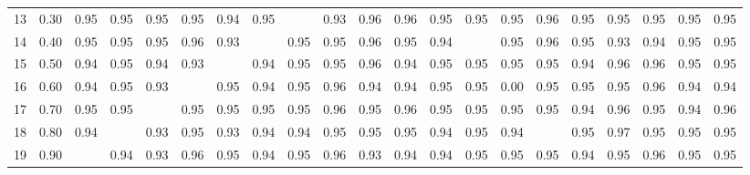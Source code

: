 \begin{table}[ht]
\begin{tabular}{rrrrrrrrrrrrrrrrrrrrr}
  13 & 0.30 & 0.95 & 0.95 & 0.95 & 0.95 & 0.94 & 0.95 &  & 0.93 & 0.96 & 0.96 & 0.95 & 0.95 & 0.95 & 0.96 & 0.95 & 0.95 & 0.95 & 0.95 & 0.95 \\ 
  14 & 0.40 & 0.95 & 0.95 & 0.95 & 0.96 & 0.93 &  & 0.95 & 0.95 & 0.96 & 0.95 & 0.94 &  & 0.95 & 0.96 & 0.95 & 0.93 & 0.94 & 0.95 & 0.95 \\ 
  15 & 0.50 & 0.94 & 0.95 & 0.94 & 0.93 &  & 0.94 & 0.95 & 0.95 & 0.96 & 0.94 & 0.95 & 0.95 & 0.95 & 0.95 & 0.94 & 0.96 & 0.96 & 0.95 & 0.95 \\ 
  16 & 0.60 & 0.94 & 0.95 & 0.93 &  & 0.95 & 0.94 & 0.95 & 0.96 & 0.94 & 0.94 & 0.95 & 0.95 & 0.00 & 0.95 & 0.95 & 0.95 & 0.96 & 0.94 & 0.94 \\ 
  17 & 0.70 & 0.95 & 0.95 &  & 0.95 & 0.95 & 0.95 & 0.95 & 0.96 & 0.95 & 0.96 & 0.95 & 0.95 & 0.95 & 0.95 & 0.94 & 0.96 & 0.95 & 0.94 & 0.96 \\ 
  18 & 0.80 & 0.94 &  & 0.93 & 0.95 & 0.93 & 0.94 & 0.94 & 0.95 & 0.95 & 0.95 & 0.94 & 0.95 & 0.94 &  & 0.95 & 0.97 & 0.95 & 0.95 & 0.95 \\ 
  19 & 0.90 &  & 0.94 & 0.93 & 0.96 & 0.95 & 0.94 & 0.95 & 0.96 & 0.93 & 0.94 & 0.94 & 0.95 & 0.95 & 0.95 & 0.94 & 0.95 & 0.96 & 0.95 & 0.95 \\ 
   \hline
\end{tabular}
\end{table}
